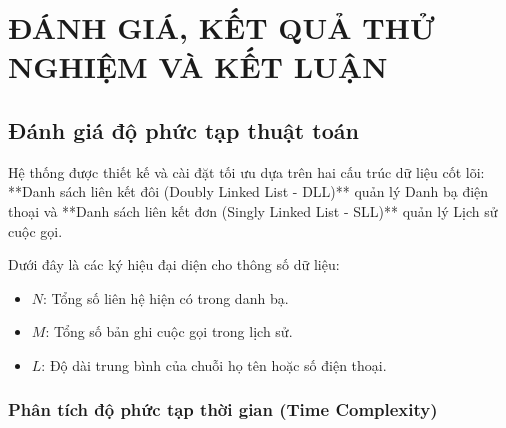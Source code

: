 \documentclass[12pt,a4paper]{report}
\begin{document}
\setcounter{chapter}{3}
\chapter{ĐÁNH GIÁ, KẾT QUẢ THỬ NGHIỆM VÀ KẾT LUẬN}
\label{chap:ket_qua_ket_luan}

\section{Đánh giá độ phức tạp thuật toán}
\label{sec:do_phuc_tap}

Hệ thống được thiết kế và cài đặt tối ưu dựa trên hai cấu trúc dữ liệu cốt lõi: **Danh sách liên kết đôi (Doubly Linked List - DLL)** quản lý Danh bạ điện thoại và **Danh sách liên kết đơn (Singly Linked List - SLL)** quản lý Lịch sử cuộc gọi.

Dưới đây là các ký hiệu đại diện cho thông số dữ liệu:
\begin{itemize}
    \item $N$: Tổng số liên hệ hiện có trong danh bạ.
    \item $M$: Tổng số bản ghi cuộc gọi trong lịch sử.
    \item $L$: Độ dài trung bình của chuỗi họ tên hoặc số điện thoại.
\end{itemize}

\subsection{Phân tích độ phức tạp thời gian (Time Complexity)}
\end{document}

